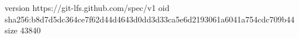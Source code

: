 version https://git-lfs.github.com/spec/v1
oid sha256:b8d7d5dc364ce7f62d44d4643d0dd3d33ca5e6d2193061a6041a754cdc709b44
size 43840

